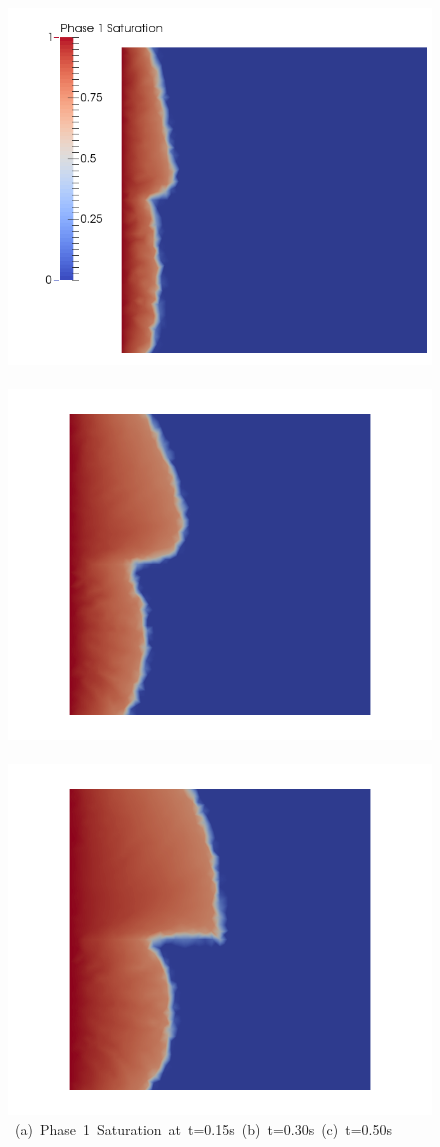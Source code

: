 \begin{landscape}
\begin{figure}[ht] 
\vbox{\vspace{-1cm}
\hbox{\includegraphics[width=.56\textwidth]{./Pics/BaseCase/BaseCase_Saturation_t_dot15.png}
      \includegraphics[width=.56\textwidth]{./Pics/BaseCase/BaseCase_Saturation_t_dot30.png}
      \includegraphics[width=.56\textwidth]{./Pics/BaseCase/BaseCase_Saturation_t_dot50.png}}
\vspace{0.cm}
\hbox{\hspace{0.5cm} (a) Phase 1 Saturation at t=0.15s \hspace{3.75cm} (b) t=0.30s \hspace{5.0cm} (c) t=0.50s}
\vspace{0.5cm}
}
\end{figure}
\end{landscape}
